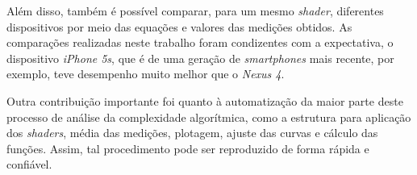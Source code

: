 	Além disso, também é possível comparar, para um mesmo \textit{shader}, diferentes dispositivos por meio das equações e valores das medições obtidos. As comparações realizadas neste trabalho foram condizentes com a expectativa, o dispositivo \textit{iPhone 5s},  que é de uma geração de \textit{smartphones} mais recente, por exemplo, teve desempenho muito melhor que o \textit{Nexus 4}.   	

	Outra contribuição importante foi quanto à automatização da maior parte deste processo de análise da complexidade algorítmica, como a estrutura para aplicação dos \textit{shaders}, média das medições, plotagem, ajuste das curvas e cálculo das funções. Assim, tal procedimento pode ser reproduzido de forma rápida e confiável. 
